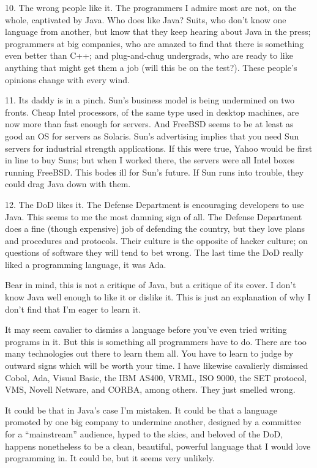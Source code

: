 10. The wrong people like it. The programmers I admire most are not, on
the whole, captivated by Java. Who does like Java? Suits, who don't know
one language from another, but know that they keep hearing about Java in
the press; programmers at big companies, who are amazed to find that
there is something even better than C++; and plug-and-chug undergrads,
who are ready to like anything that might get them a job (will this be
on the test?). These people's opinions change with every wind.

11. Its daddy is in a pinch. Sun's business model is being undermined on
two fronts. Cheap Intel processors, of the same type used in desktop
machines, are now more than fast enough for servers. And FreeBSD seems
to be at least as good an OS for servers as Solaris. Sun's advertising
implies that you need Sun servers for industrial strength applications.
If this were true, Yahoo would be first in line to buy Suns; but when I
worked there, the servers were all Intel boxes running FreeBSD. This
bodes ill for Sun's future. If Sun runs into trouble, they could drag
Java down with them.

12. The DoD likes it. The Defense Department is encouraging developers
to use Java. This seems to me the most damning sign of all. The Defense
Department does a fine (though expensive) job of defending the country,
but they love plans and procedures and protocols. Their culture is the
opposite of hacker culture; on questions of software they will tend to
bet wrong. The last time the DoD really liked a programming language, it
was Ada.

Bear in mind, this is not a critique of Java, but a critique of its
cover. I don't know Java well enough to like it or dislike it. This is
just an explanation of why I don't find that I'm eager to learn it.

It may seem cavalier to dismiss a language before you've even tried
writing programs in it. But this is something all programmers have to
do. There are too many technologies out there to learn them all. You
have to learn to judge by outward signs which will be worth your time. I
have likewise cavalierly dismissed Cobol, Ada, Visual Basic, the IBM
AS400, VRML, ISO 9000, the SET protocol, VMS, Novell Netware, and CORBA,
among others. They just smelled wrong.

It could be that in Java's case I'm mistaken. It could be that a
language promoted by one big company to undermine another, designed by a
committee for a ``mainstream'' audience, hyped to the skies, and beloved
of the DoD, happens nonetheless to be a clean, beautiful, powerful
language that I would love programming in. It could be, but it seems
very unlikely.